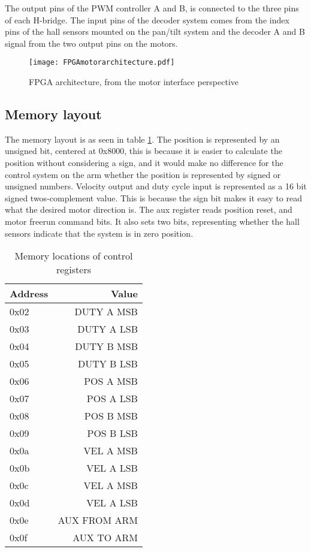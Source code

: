 The output pins of the PWM controller A and B, is connected to the three pins of each H-bridge.
The input pins of the decoder system comes from the index pins of the hall sensors mounted on the pan/tilt system and the decoder A and B signal from the two output pins on the motors.

\begin{figure}[htb]

\texttt{[image: FPGAmotorarchitecture.pdf]}

\caption{FPGA architecture, from the motor interface perspective}
\label{fig:FPGAMotorArchitecture}
\end{figure}

\subsection{Memory layout}
The memory layout is as seen in table \ref{tab:Memorymapping}. The position is represented by an unsigned bit, centered at 0x8000, this is because it is easier to calculate the position without considering a sign, and it would make no difference for the control system on the arm whether the position is represented by signed or unsigned numbers.
Velocity output and duty cycle input is represented as a 16 bit signed twos-complement value.
This is because the sign bit makes it easy to read what the desired motor direction is.
The aux register reads position reset, and motor freerun command bits. It also sets two bits, representing whether the hall sensors indicate that the system is in zero position.



\begin{table}[htb]
\centering
\begin{tabular}{|l|r|}
\hline
Address & Value \\
\hline
0x02 & DUTY A MSB \\
0x03 & DUTY A LSB\\
0x04 & DUTY B MSB\\
0x05 & DUTY B LSB\\
0x06 & POS A MSB\\
0x07 & POS A LSB\\
0x08 & POS B MSB\\
0x09 & POS B LSB\\
0x0a & VEL A MSB\\
0x0b & VEL A LSB\\
0x0c & VEL A MSB\\
0x0d & VEL A LSB\\
0x0e & AUX FROM ARM\\
0x0f & AUX TO ARM\\
\hline 
\end{tabular}
\caption{Memory locations of control registers}
\label{tab:Memorymapping}
\end{table}


